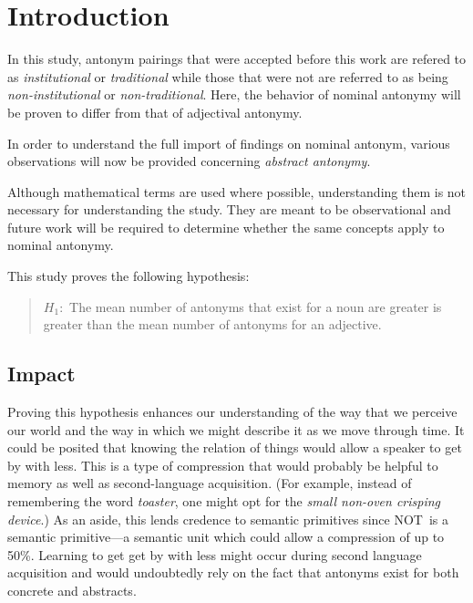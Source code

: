\section {Introduction}%
In this study, antonym pairings that were accepted before this work are refered to as \textit{institutional} or \textit{traditional} while those that were not are referred to as being \textit{non-institutional} or \textit{non-traditional}. Here, the behavior of nominal antonymy will be proven to differ from that of adjectival antonymy.  


In order to understand the full import of findings on nominal antonym, various observations will now be provided concerning \textit{abstract antonymy}. 

Although mathematical terms are used where possible, understanding them is not necessary for understanding the study.  They are meant to be observational and future work will be required to determine whether the same concepts apply to nominal antonymy.

This study proves the following hypothesis:
	\begin{quote}
		$H_{1}:$ The mean number of antonyms that exist for a noun are greater is greater than the mean number of antonyms for an adjective.
	\end{quote}

\subsection{Impact}
Proving this hypothesis enhances our understanding of the way that we perceive our world and the way in which we might describe it as we move through time.  It could be posited that knowing the relation of things would allow a speaker to get by with less. This is a type of compression that would probably be helpful to memory as well as second-language acquisition.  (For example, instead of remembering the word \textit {toaster}, one might opt for the \textit {small non-oven crisping device}\footnotemark.)  As an aside, this lends credence to semantic primitives \cite{Wierzbicka} since NOT\footnotemark~is a semantic primitive---a semantic unit which could allow a compression of up to 50\%.  Learning to get get by with less might occur during second language acquisition and would undoubtedly rely on the fact that antonyms exist for both concrete and abstracts.  

